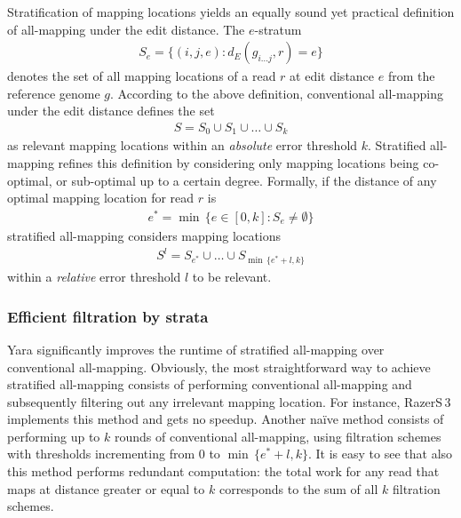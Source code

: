 Stratification of mapping locations yields an equally sound yet practical definition of all-mapping under the edit distance.
The $e$-stratum
\begin{eqnarray}
S_e = \{ (i,j,e) : d_E(g_{i \dots j},r) = e\}
\end{eqnarray}
denotes the set of all mapping locations of a read $r$ at edit distance $e$ from the reference genome $g$.
According to the above definition, conventional all-mapping under the edit distance defines the set
\begin{eqnarray}
S = S_0 \cup S_1 \cup \dots \cup S_k
\end{eqnarray}
as relevant mapping locations within an \emph{absolute} error threshold $k$.
Stratified all-mapping refines this definition by considering only mapping locations being co-optimal, or sub-optimal up to a certain degree.
Formally, if the distance of any optimal mapping location for read $r$ is
\begin{eqnarray}
e^* = \min \,\{ e \in [0,k] : S_e \neq \emptyset \}
\end{eqnarray}
stratified all-mapping considers mapping locations
\begin{eqnarray}
S^l = S_{e^*} \cup \dots \cup S_{\min \,\{ e^*+l, k\}}
\end{eqnarray}
within a \emph{relative} error threshold $l$ to be relevant.

\subsubsection{Efficient filtration by strata}

Yara significantly improves the runtime of stratified all-mapping over conventional all-mapping.
Obviously, the most straightforward way to achieve stratified all-mapping consists of performing conventional all-mapping and subsequently filtering out any irrelevant mapping location.
For instance, RazerS\,3 implements this method and gets no speedup.
Another na\"ive method consists of performing up to $k$ rounds of conventional all-mapping, using filtration schemes with thresholds incrementing from $0$ to $\min \,\{ e^*+l, k\}$.
It is easy to see that also this method performs redundant computation: the total work for any read that maps at distance greater or equal to $k$ corresponds to the sum of all $k$ filtration schemes.

